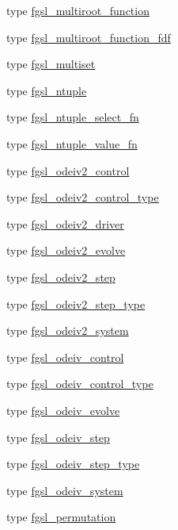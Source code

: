 \begin{DoxyCompactItemize}
type \hyperlink{structfgsl_1_1fgsl__multiroot__function}{fgsl\+\_\+multiroot\+\_\+function}
\item 
type \hyperlink{structfgsl_1_1fgsl__multiroot__function__fdf}{fgsl\+\_\+multiroot\+\_\+function\+\_\+fdf}
\item 
type \hyperlink{structfgsl_1_1fgsl__multiset}{fgsl\+\_\+multiset}
\item 
type \hyperlink{structfgsl_1_1fgsl__ntuple}{fgsl\+\_\+ntuple}
\item 
type \hyperlink{structfgsl_1_1fgsl__ntuple__select__fn}{fgsl\+\_\+ntuple\+\_\+select\+\_\+fn}
\item 
type \hyperlink{structfgsl_1_1fgsl__ntuple__value__fn}{fgsl\+\_\+ntuple\+\_\+value\+\_\+fn}
\item 
type \hyperlink{structfgsl_1_1fgsl__odeiv2__control}{fgsl\+\_\+odeiv2\+\_\+control}
\item 
type \hyperlink{structfgsl_1_1fgsl__odeiv2__control__type}{fgsl\+\_\+odeiv2\+\_\+control\+\_\+type}
\item 
type \hyperlink{structfgsl_1_1fgsl__odeiv2__driver}{fgsl\+\_\+odeiv2\+\_\+driver}
\item 
type \hyperlink{structfgsl_1_1fgsl__odeiv2__evolve}{fgsl\+\_\+odeiv2\+\_\+evolve}
\item 
type \hyperlink{structfgsl_1_1fgsl__odeiv2__step}{fgsl\+\_\+odeiv2\+\_\+step}
\item 
type \hyperlink{structfgsl_1_1fgsl__odeiv2__step__type}{fgsl\+\_\+odeiv2\+\_\+step\+\_\+type}
\item 
type \hyperlink{structfgsl_1_1fgsl__odeiv2__system}{fgsl\+\_\+odeiv2\+\_\+system}
\item 
type \hyperlink{structfgsl_1_1fgsl__odeiv__control}{fgsl\+\_\+odeiv\+\_\+control}
\item 
type \hyperlink{structfgsl_1_1fgsl__odeiv__control__type}{fgsl\+\_\+odeiv\+\_\+control\+\_\+type}
\item 
type \hyperlink{structfgsl_1_1fgsl__odeiv__evolve}{fgsl\+\_\+odeiv\+\_\+evolve}
\item 
type \hyperlink{structfgsl_1_1fgsl__odeiv__step}{fgsl\+\_\+odeiv\+\_\+step}
\item 
type \hyperlink{structfgsl_1_1fgsl__odeiv__step__type}{fgsl\+\_\+odeiv\+\_\+step\+\_\+type}
\item 
type \hyperlink{structfgsl_1_1fgsl__odeiv__system}{fgsl\+\_\+odeiv\+\_\+system}
\item 
type \hyperlink{structfgsl_1_1fgsl__permutation}{fgsl\+\_\+permutation}
\item 

\end{DoxyCompactItemize}
